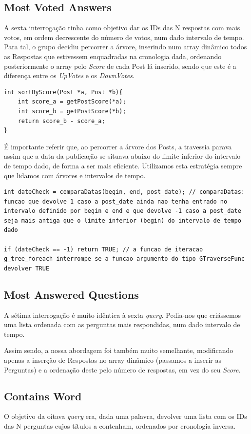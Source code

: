 \documentclass[a4paper, 11pt, oneside]{article}
\begin{document}
\subsection{Most Voted Answers}
A sexta interrogação tinha como objetivo dar os IDs das N respostas com mais votos, em ordem decrescente do número de votos, num dado intervalo de tempo. Para tal, o grupo decidiu percorrer a árvore, inserindo num array dinâmico todos as Respostas que estivessem enquadradas na cronologia dada, ordenando posteriormente o array pelo \textit{Score} de cada Post lá inserido, sendo que este é a diferença entre os \textit{UpVotes} e os \textit{DownVotes}.
\begin{lstlisting}[caption=Query 6 - função de ordenação]
int sortByScore(Post *a, Post *b){
	int score_a = getPostScore(*a);
	int score_b = getPostScore(*b);
	return score_b - score_a;
}
\end{lstlisting}
É importante referir que, ao percorrer a árvore dos Posts, a travessia parava assim que a data da publicação se situava abaixo do limite inferior do intervalo de tempo dado, de forma a ser mais eficiente. Utilizamos esta estratégia sempre que lidamos com árvores e intervalos de tempo.
\begin{lstlisting}[caption=Interrupção da travessia nas árvores]
int dateCheck = comparaDatas(begin, end, post_date); // comparaDatas: funcao que devolve 1 caso a post_date ainda nao tenha entrado no intervalo definido por begin e end e que devolve -1 caso a post_date seja mais antiga que o limite inferior (begin) do intervalo de tempo dado

if (dateCheck == -1) return TRUE; // a funcao de iteracao g_tree_foreach interrompe se a funcao argumento do tipo GTraverseFunc devolver TRUE
\end{lstlisting}

\subsection{Most Answered Questions}
A sétima interrogação é muito idêntica à sexta \textit{query}. Pedia-nos que criássemos uma lista ordenada com as perguntas mais respondidas, num dado intervalo de tempo.

Assim sendo, a nossa abordagem foi também muito semelhante, modificando apenas a inserção de Respostas no array dinâmico (passamos a inserir as Perguntas) e a ordenação deste pelo número de respostas, em vez do seu \textit{Score}.

\subsection{Contains Word}
O objetivo da oitava \textit{query} era, dada uma palavra, devolver uma lista com os IDs das N perguntas cujos títulos a contenham, ordenados por cronologia inversa.
\end{document}
